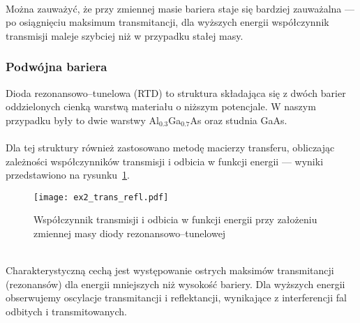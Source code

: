 \documentclass{article}
\begin{document}
\\
Można zauważyć, że przy zmiennej masie bariera staje się bardziej zauważalna — po osiągnięciu maksimum transmitancji, dla wyższych energii współczynnik transmisji maleje szybciej niż w przypadku stałej masy.
\subsubsection{Podwójna bariera}
Dioda rezonansowo--tunelowa (RTD) to struktura składająca się z dwóch barier oddzielonych cienką warstwą materiału o niższym potencjale. 
W naszym przypadku były to dwie warstwy Al$_{0.3}$Ga$_{0.7}$As oraz studnia GaAs.\\
\\
Dla tej struktury również zastosowano metodę macierzy transferu, obliczając zależności współczynników transmisji i odbicia w funkcji energii — wyniki przedstawiono na rysunku~\ref{fig:ex2-trans-refl}.\\
\begin{figure}[htp!]
    \centering
    \texttt{[image: ex2\_trans\_refl.pdf]}
    \caption{Współczynnik transmisji i odbicia w funkcji energii przy założeniu zmiennej masy diody rezonansowo--tunelowej}
    \label{fig:ex2-trans-refl}
\end{figure}
\\
Charakterystyczną cechą jest występowanie ostrych maksimów transmitancji (rezonansów) dla energii mniejszych niż wysokość bariery.  
Dla wyższych energii obserwujemy oscylacje transmitancji i reflektancji, wynikające z interferencji fal odbitych i transmitowanych.
\end{document}
